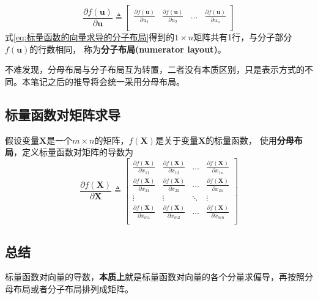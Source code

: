 \documentclass[withoutpreface,bwprint]{NoteBook}
\begin{document}
\begin{equation}
    \label{eq:标量函数的向量求导的分子布局}
        \frac{\partial f(\mathbf{u})}{\partial \mathbf{u}}
        \triangleq
        \begin{bmatrix}
        \frac{\partial f(\mathbf{u})}{\partial u_1} & 
        \frac{\partial f(\mathbf{u})}{\partial u_2} &
        \dots &
        \frac{\partial f(\mathbf{u})}{\partial u_n}\\
        \end{bmatrix}
\end{equation}
式\cref{eq:标量函数的向量求导的分子布局}得到的$1 \times n$矩阵共有1行，与分子部分$f(\mathbf{u})$的行数相同，
称为\textbf{分子布局(numerator layout)}。

不难发现，分母布局与分子布局互为转置，二者没有本质区别，只是表示方式的不同。本笔记之后的推导将会统一采用分母布局。

\subsection{标量函数对矩阵求导}
假设变量$\mathbf{X}$是一个$m \times n$的矩阵，$f(\mathbf{X})$是关于变量$\mathbf{X}$的标量函数，
使用\textbf{分母布局}，定义标量函数对矩阵的导数为
\begin{equation}
    \label{eq:标量函数对矩阵求导}
    \frac{\partial f(\mathbf{X})}{\partial \mathbf{X}} 
    \triangleq
    \begin{bmatrix} 
    \frac{\partial f(\mathbf{X})}{\partial x_{11}} & \frac{\partial f(\mathbf{X})}{\partial x_{12}} & \dots & \frac{\partial f(\mathbf{X})}{\partial x_{1n}} \\
    \frac{\partial f(\mathbf{X})}{\partial x_{21}} & \frac{\partial f(\mathbf{X})}{\partial x_{22}} & \dots & \frac{\partial f(\mathbf{X})}{\partial x_{2n}} \\
    \vdots & \vdots & \ddots & \vdots \\
    \frac{\partial f(\mathbf{X})}{\partial x_{m1}} & \frac{\partial f(\mathbf{X})}{\partial x_{m2}} & \dots & \frac{\partial f(\mathbf{X})}{\partial x_{mn}} \\
    \end{bmatrix} 
\end{equation}

\subsection{总结}
标量函数对向量的导数，\textbf{本质上}就是标量函数对向量的各个分量求偏导，再按照分母布局或者分子布局排列成矩阵。
\end{document}
